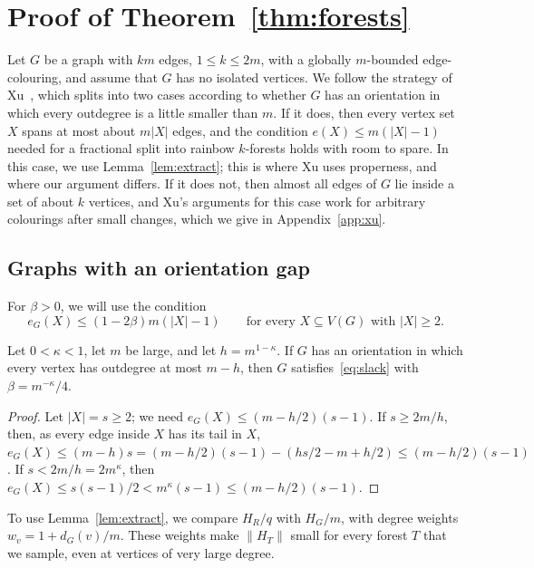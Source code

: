 \section{Proof of Theorem~\ref{thm:forests}}\label{sec:thmC}
Let $G$ be a graph with $km$ edges, $1\le k\le2m$, with a globally $m$-bounded edge-colouring, and assume that $G$ has no isolated vertices.
We follow the strategy of Xu~\cite{Xu}, which splits into two cases according to whether $G$ has an orientation in which every outdegree is a little smaller than $m$.
If it does, then every vertex set $X$ spans at most about $m|X|$ edges, and the condition $e(X)\le m(|X|-1)$ needed for a fractional split into rainbow $k$-forests holds with room to spare. In this case, we use Lemma~\ref{lem:extract}; this is where Xu uses properness, and where our argument differs.
If it does not, then almost all edges of $G$ lie inside a set of about $k$ vertices, and Xu's arguments for this case work for arbitrary colourings after small changes, which we give in Appendix~\ref{app:xu}.

\subsection{Graphs with an orientation gap}
For $\beta>0$, we will use the condition
\begin{equation}\label{eq:slack}
e_G(X)\le(1-2\beta)m(|X|-1)\qquad\text{for every }X\subseteq V(G)\text{ with }|X|\ge2 .
\end{equation}

\begin{lemma}\label{lem:orient}
Let $0<\kappa<1$, let $m$ be large, and let $h=m^{1-\kappa}$. If $G$ has an orientation in which every vertex has outdegree at most $m-h$, then $G$ satisfies~\eqref{eq:slack} with $\beta=m^{-\kappa}/4$.
\end{lemma}
\begin{proof}
Let $|X|=s\ge2$; we need $e_G(X)\le(m-h/2)(s-1)$.
If $s\ge2m/h$, then, as every edge inside $X$ has its tail in $X$, $e_G(X)\le(m-h)s=(m-h/2)(s-1)-(hs/2-m+h/2)\le(m-h/2)(s-1)$.
If $s<2m/h=2m^\kappa$, then $e_G(X)\le s(s-1)/2<m^\kappa(s-1)\le(m-h/2)(s-1)$.
\end{proof}

To use Lemma~\ref{lem:extract}, we compare $H_R/q$ with $H_G/m$, with degree weights $w_v=1+d_G(v)/m$.
These weights make $\|H_T\|$ small for every forest $T$ that we sample, even at vertices of very large degree.

